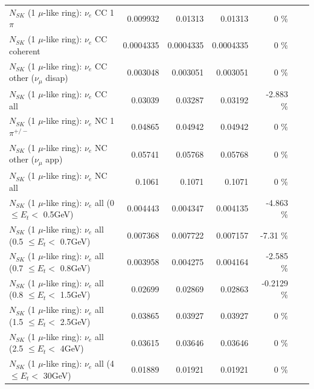 \begin{table}
\begin{tabular}{| l | r | r | r  r | r  r |}
                                 $N_{SK}$ (1 $\mu$-like ring): $\nu_e$ CC 1$\pi$ &        0.009932 &        0.01313 &        0.01313 &       0 \%  & & \\
                               $N_{SK}$ (1 $\mu$-like ring): $\nu_e$ CC coherent &       0.0004335 &      0.0004335 &      0.0004335 &       0 \%  & & \\
                $N_{SK}$ (1 $\mu$-like ring): $\nu_e$ CC other ($\nu_\mu$ disap) &        0.003048 &       0.003051 &       0.003051 &       0 \%  & & \\
                                  $N_{SK}$ (1 $\mu$-like ring): $\nu_{e}$ CC all &         0.03039 &        0.03287 &        0.03192 &  -2.883 \%  & & \\
\hline
                           $N_{SK}$ (1 $\mu$-like ring): $\nu_e$ NC 1$\pi^{+/-}$ &         0.04865 &        0.04942 &        0.04942 &       0 \%  & & \\
                  $N_{SK}$ (1 $\mu$-like ring): $\nu_e$ NC other ($\nu_\mu$ app) &         0.05741 &        0.05768 &        0.05768 &       0 \%  & & \\
                                  $N_{SK}$ (1 $\mu$-like ring): $\nu_{e}$ NC all &          0.1061 &         0.1071 &         0.1071 &       0 \%  & & \\
\hline
           $N_{SK}$ (1 $\mu$-like ring): $\nu_{e}$ all (0 $\leq E_{t} <$ 0.5GeV) &        0.004443 &       0.004347 &       0.004135 &  -4.863 \%  & & \\
         $N_{SK}$ (1 $\mu$-like ring): $\nu_{e}$ all (0.5 $\leq E_{t} <$ 0.7GeV) &        0.007368 &       0.007722 &       0.007157 &   -7.31 \%  & & \\
         $N_{SK}$ (1 $\mu$-like ring): $\nu_{e}$ all (0.7 $\leq E_{t} <$ 0.8GeV) &        0.003958 &       0.004275 &       0.004164 &  -2.585 \%  & & \\
         $N_{SK}$ (1 $\mu$-like ring): $\nu_{e}$ all (0.8 $\leq E_{t} <$ 1.5GeV) &         0.02699 &        0.02869 &        0.02863 & -0.2129 \%  & & \\
         $N_{SK}$ (1 $\mu$-like ring): $\nu_{e}$ all (1.5 $\leq E_{t} <$ 2.5GeV) &         0.03865 &        0.03927 &        0.03927 &       0 \%  & & \\
           $N_{SK}$ (1 $\mu$-like ring): $\nu_{e}$ all (2.5 $\leq E_{t} <$ 4GeV) &         0.03615 &        0.03646 &        0.03646 &       0 \%  & & \\
            $N_{SK}$ (1 $\mu$-like ring): $\nu_{e}$ all (4 $\leq E_{t} <$ 30GeV) &         0.01889 &        0.01921 &        0.01921 &       0 \%  & & \\

\end{tabular}
\end{table}

